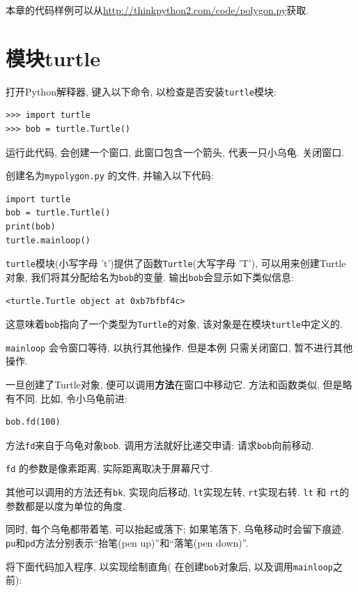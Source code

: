 \documentclass[10pt]{book}
\begin{document}
本章的代码样例可以从\url{http://thinkpython2.com/code/polygon.py}获取. 


\section{模块turtle}
\label{turtle}

打开Python解释器, 键入以下命令, 以检查是否安装{\tt turtle}模块:

\begin{verbatim}
>>> import turtle
>>> bob = turtle.Turtle()
\end{verbatim}

运行此代码, 会创建一个窗口, 此窗口包含一个箭头, 代表一只小乌龟. 
关闭窗口. 

创建名为{\tt mypolygon.py} 的文件, 并输入以下代码:

\begin{verbatim}
import turtle
bob = turtle.Turtle()
print(bob)
turtle.mainloop()
\end{verbatim}
%
{\tt turtle}模块(小写字母 't')提供了函数{\tt Turtle}(大写字母 'T'), 
可以用来创建Turtle 对象, 我们将其分配给名为{\tt bob}的变量. 
输出{\tt bob}会显示如下类似信息:

\begin{verbatim}
<turtle.Turtle object at 0xb7bfbf4c>
\end{verbatim}
%
这意味着{\tt bob}指向了一个类型为{\tt Turtle}的对象, 
该对象是在模块{\tt turtle}中定义的.

\verb"mainloop" 会令窗口等待, 以执行其他操作. 但是本例
只需关闭窗口, 暂不进行其他操作. 

一旦创建了Turtle对象, 便可以调用{\bf 方法}在窗口中移动它. 
方法和函数类似, 但是略有不同. 比如, 令小乌龟前进:

\begin{verbatim}
bob.fd(100)
\end{verbatim}
%
方法{\tt fd}来自于乌龟对象{\tt bob}. 
调用方法就好比递交申请: 请求{\tt bob}向前移动. 

{\tt fd} 的参数是像素距离, 实际距离取决于屏幕尺寸. 

其他可以调用的方法还有{\tt bk}, 实现向后移动, 
{\tt lt}实现左转, {\tt rt}实现右转. 
{\tt lt} 和 {\tt rt}的参数都是以度为单位的角度. 

同时, 每个乌龟都带着笔, 可以抬起或落下;
如果笔落下, 乌龟移动时会留下痕迹. 
{\tt pu}和{\tt pd}方法分别表示``抬笔(pen up)''和``落笔(pen down)''.

将下面代码加入程序, 以实现绘制直角(
在创建{\tt bob}对象后, 以及调用\verb"mainloop"之前):
\end{document}
